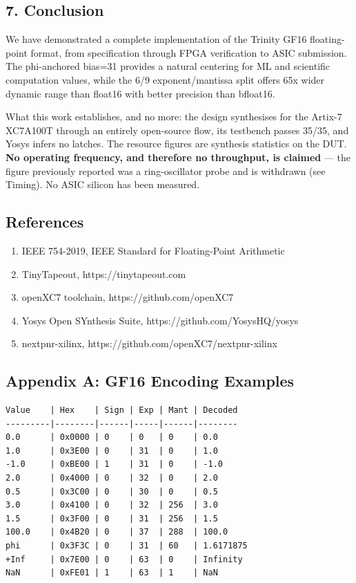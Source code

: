 \documentclass[
]{article}
\providecommand{\tightlist}{%
  \setlength{\itemsep}{0pt}\setlength{\parskip}{0pt}}
\begin{document}
\subsection{7. Conclusion}\label{conclusion}

We have demonstrated a complete implementation of the Trinity GF16
floating-point format, from specification through FPGA verification to
ASIC submission. The phi-anchored bias=31 provides a natural centering
for ML and scientific computation values, while the 6/9
exponent/mantissa split offers 65x wider dynamic range than float16 with
better precision than bfloat16.

What this work establishes, and no more: the design synthesises for the
Artix-7 XC7A100T through an entirely open-source flow, its testbench passes
35/35, and Yosys infers no latches. The resource figures are synthesis
statistics on the DUT. \textbf{No operating frequency, and therefore no
throughput, is claimed} --- the figure previously reported was a
ring-oscillator probe and is withdrawn (see Timing). No ASIC silicon has been
measured.

\subsection{References}\label{references}

\begin{enumerate}
\def\labelenumi{\arabic{enumi}.}
\tightlist
\item
  IEEE 754-2019, IEEE Standard for Floating-Point Arithmetic
\item
  TinyTapeout, https://tinytapeout.com
\item
  openXC7 toolchain, https://github.com/openXC7
\item
  Yosys Open SYnthesis Suite, https://github.com/YosysHQ/yosys
\item
  nextpnr-xilinx, https://github.com/openXC7/nextpnr-xilinx
\end{enumerate}

\subsection{Appendix A: GF16 Encoding
Examples}\label{appendix-a-gf16-encoding-examples}

\begin{verbatim}
Value    | Hex    | Sign | Exp | Mant | Decoded
---------|--------|------|-----|------|--------
0.0      | 0x0000 | 0    | 0   | 0    | 0.0
1.0      | 0x3E00 | 0    | 31  | 0    | 1.0
-1.0     | 0xBE00 | 1    | 31  | 0    | -1.0
2.0      | 0x4000 | 0    | 32  | 0    | 2.0
0.5      | 0x3C00 | 0    | 30  | 0    | 0.5
3.0      | 0x4100 | 0    | 32  | 256  | 3.0
1.5      | 0x3F00 | 0    | 31  | 256  | 1.5
100.0    | 0x4B20 | 0    | 37  | 288  | 100.0
phi      | 0x3F3C | 0    | 31  | 60   | 1.6171875
+Inf     | 0x7E00 | 0    | 63  | 0    | Infinity
NaN      | 0xFE01 | 1    | 63  | 1    | NaN
\end{verbatim}
\end{document}
